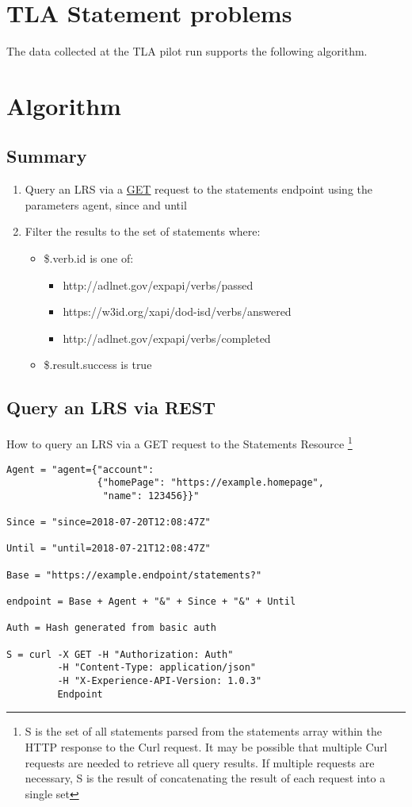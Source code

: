 \documentclass{article}
\begin{document}
\section{TLA Statement problems}
The data collected at the TLA pilot run supports the following algorithm.
\section{Algorithm}
\subsection{Summary}
\begin{enumerate}
  \item Query an LRS via a \href{https://github.com/adlnet/xAPI-Spec/blob/master/xAPI-Communication.md#213-get-statements}{GET} request to the statements endpoint using the parameters agent, since and until
  \item Filter the results to the set of statements where:
    \begin{itemize}
    \item \$.verb.id is one of:
      \begin{itemize}
      \item http://adlnet.gov/expapi/verbs/passed
      \item https://w3id.org/xapi/dod-isd/verbs/answered
      \item http://adlnet.gov/expapi/verbs/completed
      \end{itemize}
    \item \$.result.success is true
    \end{itemize}
  \end{enumerate}

  \subsection{Query an LRS via REST}
  How to query an LRS via a GET request to the Statements Resource
  \footnote{\label{moreLink} S is the set of all statements parsed from the statements array within the HTTP response to the Curl request. It may be possible that multiple Curl requests are needed to retrieve all query results. If multiple requests are necessary, S is the result of concatenating the result of each request into a single set}
  \begin{lstlisting}[frame=single]
Agent = "agent={"account":
                {"homePage": "https://example.homepage",
                 "name": 123456}}"

Since = "since=2018-07-20T12:08:47Z"

Until = "until=2018-07-21T12:08:47Z"

Base = "https://example.endpoint/statements?"

endpoint = Base + Agent + "&" + Since + "&" + Until

Auth = Hash generated from basic auth

S = curl -X GET -H "Authorization: Auth"
         -H "Content-Type: application/json"
         -H "X-Experience-API-Version: 1.0.3"
         Endpoint
  \end{lstlisting}
\end{document}
